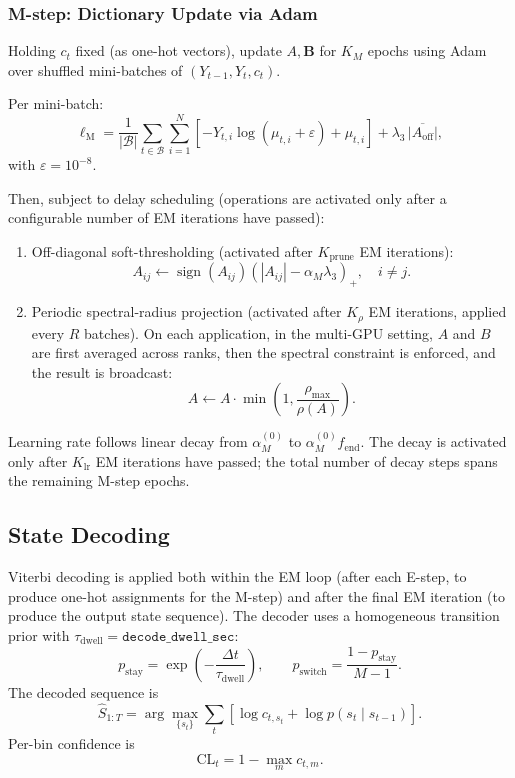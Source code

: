 \documentclass[11pt]{article}
\begin{document}
\subsubsection{M-step: Dictionary Update via Adam}

Holding \(c_t\) fixed (as one-hot vectors), update \(A,\mathbf{B}\) for \(K_M\) epochs using
Adam over shuffled mini-batches of \((Y_{t-1},Y_t,c_t)\).

Per mini-batch:
\begin{equation}
  \ell_{\mathrm{M}} =
  \frac{1}{|\mathcal{B}|}
  \sum_{t\in\mathcal{B}}\sum_{i=1}^{N}
  \left[-Y_{t,i}\log(\mu_{t,i}+\varepsilon)+\mu_{t,i}\right]
  + \lambda_3\,\overline{|A_{\mathrm{off}}|},
\end{equation}
with \(\varepsilon=10^{-8}\).

Then, subject to delay scheduling (operations are activated only after a configurable number of EM iterations have passed):
\begin{enumerate}
  \item Off-diagonal soft-thresholding (activated after \(K_{\mathrm{prune}}\) EM iterations):
  \[
    A_{ij}\leftarrow \operatorname{sign}(A_{ij})
    \left(|A_{ij}|-\alpha_M\lambda_3\right)_+,\quad i\neq j.
  \]
  \item Periodic spectral-radius projection (activated after \(K_{\rho}\) EM iterations, applied every \(R\) batches). On each application, in the multi-GPU setting, \(A\) and \(B\) are first averaged across ranks, then the spectral constraint is enforced, and the result is broadcast:
  \[
    A \leftarrow A\cdot \min\!\left(1,\frac{\rho_{\max}}{\rho(A)}\right).
  \]
\end{enumerate}

Learning rate follows linear decay from \(\alpha_M^{(0)}\) to
\(\alpha_M^{(0)}f_{\mathrm{end}}\). The decay is activated only after \(K_{\mathrm{lr}}\) EM iterations have passed; the total number of decay steps spans the remaining M-step epochs.

\subsection{State Decoding}
\label{sec:decode}

Viterbi decoding is applied both within the EM loop (after each E-step, to produce one-hot assignments for the M-step) and after the final EM iteration (to produce the output state sequence). The decoder uses a homogeneous transition prior with
\(\tau_{\mathrm{dwell}}=\texttt{decode\_dwell\_sec}\):
\begin{equation}
  p_{\mathrm{stay}}=\exp\!\left(-\frac{\Delta t}{\tau_{\mathrm{dwell}}}\right),
  \qquad
  p_{\mathrm{switch}}=\frac{1-p_{\mathrm{stay}}}{M-1}.
\end{equation}
The decoded sequence is
\begin{equation}
  \hat{S}_{1:T}=\arg\max_{\{s_t\}}
  \sum_t\left[\log c_{t,s_t}+\log p(s_t\mid s_{t-1})\right].
\end{equation}
Per-bin confidence is
\[
\mathrm{CL}_t = 1-\max_m c_{t,m}.
\]
\end{document}
